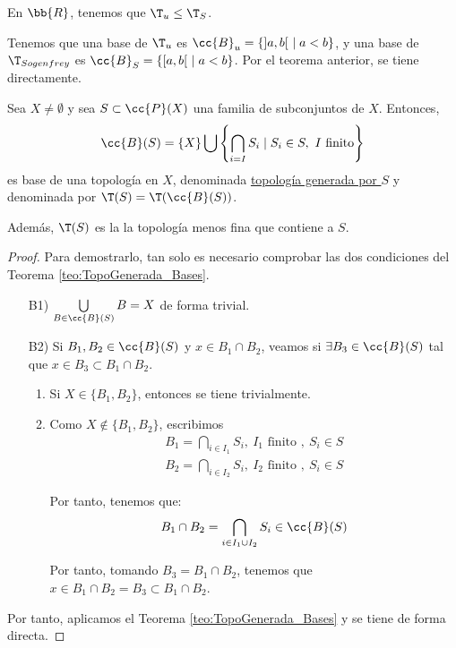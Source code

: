 \begin{ejemplo}
    En $\bb{R}$, tenemos que $\T_u\leq \T_S$.

    Tenemos que una base de $\T_u$ es $\cc{B}_u=\{]a,b[~\mid a<b\}$, y una base de $\T_{Sogenfrey}$ es $\cc{B}_S=\{[a,b[~\mid a<b\}$. Por el teorema anterior, se tiene directamente.
\end{ejemplo}

\begin{prop}\label{teo:TopoGenerada_Conjunto}
    Sea $X\neq \emptyset$ y sea $S\subset \cc{P}(X)$ una familia de subconjuntos de $X$. Entonces,
    \begin{equation*}
        \cc{B}(S)=\{X\}\bigcup \left\{\bigcap_{i=I}S_i \mid S_i\in S,~I\text{ finito}\right\}
    \end{equation*}
    es base de una topología en $X$, denominada \ul{topología generada por $S$} y denominada por $\T(S)=\T(\cc{B}(S))$.

    Además, $\T(S)$ es la la topología menos fina que contiene a $S$.
\end{prop}
\begin{proof}
    Para demostrarlo, tan solo es necesario comprobar las dos condiciones del Teorema \ref{teo:TopoGenerada_Bases}.
    \begin{enumerate}
        \item[B1)] $\bigcup\limits_{B\in \cc{B}(S)} B=X$ de forma trivial.
        \item[B2)] Si $B_1, B_2\in \cc{B}(S)$ y $x\in B_1\cap B_2$, veamos si $\exists B_3\in \cc{B}(S)$ tal que $x\in B_3\subset B_1\cap B_2$.
        \begin{enumerate}
            \item Si $X\in \{B_1,B_2\}$, entonces se tiene trivialmente.
            \item Como $X\notin \{B_1,B_2\}$, escribimos
            \begin{gather*}
                B_1=\bigcap\limits_{i\in I_1}S_i,~I_1 \text{ finito },~S_i\in S\\
                B_2=\bigcap\limits_{i\in I_2}S_i,~I_2 \text{ finito },~S_i\in S
            \end{gather*}

            Por tanto, tenemos que:
            $$B_1\cap B_2 = \bigcap_{i\in I_1\cup I_2}S_i\in \cc{B}(S)$$

            Por tanto, tomando $B_3=B_1\cap B_2$, tenemos que $x\in B_1\cap B_2=B_3\subset B_1\cap B_2$.
        \end{enumerate}
    \end{enumerate}

    Por tanto, aplicamos el Teorema \ref{teo:TopoGenerada_Bases} y se tiene de forma directa.
\end{proof}

